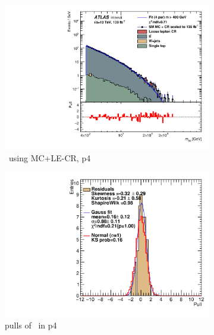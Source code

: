\newpage

\begin{figure}[ht]
    \centering
    \begin{subfigure}[h]{0.38\linewidth}
    \includegraphics[scale=0.3]{figs/ch6/fit/variable_nosmooth/p4/1PB/output_SMMCplusCR_Mbb_p4.pdf}%
    \caption{\mbb \ using MC+LE-CR, p4}
    \end{subfigure}
    \hfill
    \begin{subfigure}[h]{0.4\linewidth}
    \includegraphics[scale=0.32]{figs/ch6/fit/variable_nosmooth/p4/1PB/pull_SMMCplusCR_Mbb_p4.pdf}%
    \caption{pulls of \mbb \ in p4}
    \end{subfigure}
    \hfill
    \begin{subfigure}[h]{0.38\linewidth}

\end{subfigure}
\end{figure}
